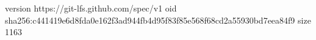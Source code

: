 version https://git-lfs.github.com/spec/v1
oid sha256:c441419e6d8fda0e162f3ad944fb4d95f83f85e568f68cd2a55930bd7eea84f9
size 1163
